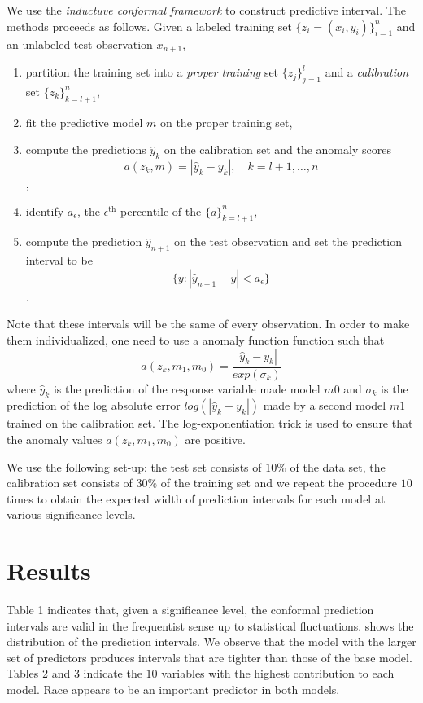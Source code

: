 \documentclass[10pt]{jmlr}%
\begin{document}
We use the \textit{inductuve conformal framework} to construct predictive interval. The methods proceeds as follows. Given a labeled training set $\{z_i = (x_i, y_i)\}_{i=1}^n$ and an unlabeled test observation $x_{n+1}$,
\begin{enumerate}
	\item partition the training set into a \textit{proper training} set $\{z_j\}_{j=1}^l$ and a \textit{calibration} set $\{z_k \}_{k=l+1}^n$,
	\item fit the predictive model $m$ on the proper training set,
	\item compute the predictions $\hat{y}_k$ on the calibration set and the anomaly scores
	$$a(z_k, m) = |\hat{y}_k - y_k|, \quad k = l+1, \dots, n$$,
	\item identify $a_\epsilon$, the $\epsilon^{\text{th}}$ percentile of the $\{a\}_{k=l+1}^n$,
	\item compute the prediction $\hat{y}_{n+1}$ on the test observation and set the prediction interval to be
	$$\{y: |\hat{y}_{n+1} - y| < a_\epsilon\}$$.
\end{enumerate}
Note that these intervals will be the same of every observation. In order to make them individualized, one need to use a anomaly function function such that
$$a(z_k, m_1, m_0) = \dfrac{|\hat{y}_k - y_k|}{exp(\sigma_k)}$$
where $\hat{y}_k$ is the prediction of the response variable made model $m0$ and $\sigma_k$ is the prediction of the log absolute error $log(|\hat{y}_k - y_k|)$ made by a second model $m1$ trained on the calibration set. The log-exponentiation trick is used to ensure that the anomaly values $a(z_k, m_1, m_0)$ are positive.

We use the following set-up: the test set consists of $10\%$ of the data set, the calibration set consists of $30\%$ of the training set and we repeat the procedure $10$ times to obtain the expected width of prediction
intervals for each model at various significance levels.



\section{Results}
\label{sec:results}

Table 1 indicates that, given a significance level, the conformal prediction intervals are valid in the frequentist sense up to statistical fluctuations.  shows the distribution of the prediction intervals. We observe that the model with the larger set of predictors produces intervals that are tighter than those of the base model. Tables 2 and 3 indicate the $10$ variables with the highest contribution to each model. Race appears to be an important predictor in both models. 
\end{document}
